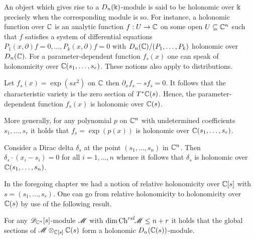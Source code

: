 An object which gives rise to a $D_n(\Bbbk)$-module is said to be holonomic over $\Bbbk$ precisely when the corresponding module is so.
For instance, a holonomic function over $\mathbb{C}$ is an analytic function $f:U\to \mathbb{C}$ on some open $U\subseteq \mathbb{C}^n$ such that $f$ satisfies a system of differential equations $P_{1}(x,\partial)f = 0,\ldots, P_{k}(x,\partial)f=0$ with $D_n(\mathbb{C})/(P_1,\ldots,P_k)$ holonomic over $D_n(\mathbb{C})$.
For a parameter-dependent function $f_s(x)$ one can speak of holonomicity over $\mathbb{C}(s_1,\ldots,s_r)$.
These notions also apply to distributions.
\begin{example}
  Let $f_s(x) = \exp(sx^2)$ on $\mathbb{C}$ then  $\partial_{x}f_s - sf_s = 0$.
  It follows that the characteristic variety is the zero section of $T^*\mathbb{C}(s)$.
  Hence, the parameter-dependent function $f_s(x)$ is holonomic over $\mathbb{C}(s)$.

  More generally, for any polynomial $p$ on $\mathbb{C}^n$ with undetermined coefficients $s_1,\ldots,s_r$ it holds that $f_s = \exp(p(x))$ is holonomic over $\mathbb{C}(s_1,\ldots,s_r)$.
\end{example}
\begin{example}
  Consider a Dirac delta $\delta_{s}$ at the point $(s_1,\ldots,s_n)$ in $\mathbb{C}^n$.
  Then $\delta_{s}\cdot (x_i - s_i) = 0$ for all $i=1,\ldots,n$ whence it follows that $\delta_s$ is holonomic over $\mathbb{C}(s_1,\ldots,s_n)$.
\end{example}
In the foregoing chapter we had a notion of relative holonomicity over $\mathbb{C}[s]$ with $s = (s_1,\ldots,s_r)$.
One can go from relative holonomicity to holonomicity over $\mathbb{C}(s)$ by use of the following result.
\begin{lemma}
    For any $\mathscr{D}_{\mathbb{C}^n}[s]$-module $\mathscr{M}$ with $\dim\operatorname{Ch}^{rel}\mkern-5mu\mathscr{M}\leq n+r$ it holds that the global sections of $\mathscr{M}\otimes_{\mathbb{C}[s]}\mathbb{C}(s)$ form a holonomic $D_n(\mathbb{C}(s))$-module.
  \end{lemma}
